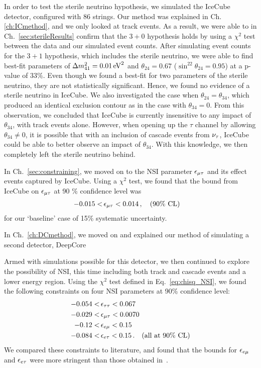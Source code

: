 In order to test the sterile neutrino hypothesis, we simulated the IceCube detector, configured with 86 strings. Our method was explained in Ch.\ref{ch:ICmethod}, and we only looked at track events. 
As a result, we were able to in Ch.~\ref{sec:sterileResults} confirm that the $3+0$ hypothesis holds by using a $\chi^2$ test between the data and our simulated event counts. %
After simulating event counts for the $3+1$ hypothesis, which includes the sterile neutrino, we were able to find best-fit parameters of 
$\dm[41] = \SI{0.01}{\eV^2}$ and $\theta_{24} = 0.67$ ($\sin^22\theta_{24} = 0.95$) at 
a p-value of $33\%$. Even though we found a best-fit for two parameters of the sterile neutrino, they are not statistically significant. Hence, we found no evidence of a sterile neutrino in IceCube.
We also investigated the case when $\theta_{24} = \theta_{34}$, which produced an identical exclusion contour as in the case with $\theta_{34}=0$. From this observation, 
we concluded that IceCube is currently insensitive to any impact of $\theta_{34}$, with track events alone. However,
when opening up the $\tau$ channel by allowing $\theta_{34} \neq 0$, it is possible that with an inclusion of cascade events from $\nu_\tau$, IceCube could be able to better observe 
an impact of $\theta_{34}$. With this knowledge, we then completely left the sterile neutrino behind.

In Ch.~\ref{sec:constraining}, we moved on to the NSI parameter $\epsilon_{\mu\tau}$ and its effect events captured by IceCube. 
Using a $\chi^2$ test, we found that the bound from IceCube on $\epsilon_{\mu\tau}$ at 90 \% confidence level was 
\begin{align}
    -0.015 <\,& \epsilon_{\mu\tau} < 0.014\,, \quad (90\% \text{ CL})
\end{align}
for our `baseline' case of 15\% systematic uncertainty.

In Ch.~\ref{ch:DCmethod}, we moved on and explained our method of simulating a second detector, DeepCore

Armed with simulations possible for this detector, we then continued to explore the possibility of NSI, this time including both track and cascade events and a lower energy region.
Using the $\chi^2$ test defined in Eq.~\ref{eq:chisq_NSI}, we found the following constraints on four NSI parameters at 90\% confidence level:
\begin{align}
    -0.054 <&\, \epsilon_{\tau\tau} < 0.067 \nonumber \\
    -0.029 <&\, \epsilon_{\mu\tau} < 0.0070 \nonumber \\
    -0.12 <&\, \epsilon_{e\mu} < 0.15 \nonumber \\
    -0.084 <&\, \epsilon_{e\tau} < 0.15\,. \quad (\text{all at }90\% \text{ CL})
 \end{align}
We compared these constraints to literature, and found that the bounds for $\epsilon_{e\mu}$ and $\epsilon_{e\tau}$ were more stringent than those obtained in~\cite{demidov}.


